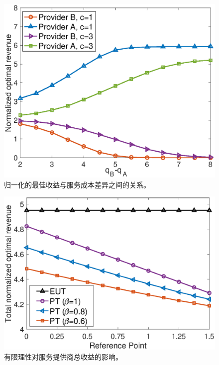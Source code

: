 \begin{figure}[htb]
\centering
\includegraphics[scale=0.54]{./pic/cost2.eps}
\vspace{-0.0cm}
\caption{归一化的最佳收益与服务成本差异之间的关系。}\label{fg:Fig3}
\end{figure}

\begin{figure}[htb]
\centering
\includegraphics[scale=0.54]{./pic/prospect2.eps}
\vspace{-0.0cm}
\caption{有限理性对服务提供商总收益的影响。}\label{fg:prospect}
\end{figure}


